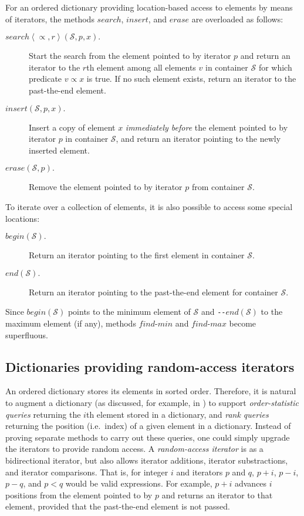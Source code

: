 \documentclass{DIKU-article}
\newcommand{\sequence}[1]{\left\langle#1\right\rangle}
\newcommand{\Findmin}{\mbox{$\mathit{find}$}\textnormal{-}\allowbreak{}\mbox{$\mathit{min}$}}
\newcommand{\Findmax}{\mbox{$\mathit{find}$}\textnormal{-}\allowbreak{}\mbox{$\mathit{max}$}}
\newcommand{\Insert}{\mbox{$\mathit{insert}$}}
\newcommand{\Erase}{\mbox{$\mathit{erase}$}}
\newcommand{\Begin}{\mbox{$\mathit{begin}$}}
\newcommand{\End}{\mbox{$\mathit{end}$}}
\newcommand{\Search}{\mbox{$\mathit{search}$}}
\begin{document}
For an ordered dictionary providing location-based access to elements
by means of iterators, the methods \Search{}, \Insert{}, and
\Erase{} are overloaded as follows:
\begin{description}
\item[$\Search\sequence{\propto, r}(\mathcal{S}, p, x).$] 
Start the search from the element pointed to by iterator $p$ and return
an iterator to the $r$th element among all elements $v$ in container
$\mathcal{S}$ for which predicate $v \propto x$ is true. If no such
element exists,  return an iterator to the past-the-end element.

\item[\Insert{}$(\mathcal{S}, p, x).$] Insert a copy of element $x$
\emph{immediately before} the element pointed to by iterator $p$ in
container $\mathcal{S}$, and return an iterator pointing to the newly inserted element.

\item[\Erase{}$(\mathcal{S}, p).$] Remove the element pointed to by iterator $p$
from container $\mathcal{S}$.
\end{description}

To iterate over a collection of elements, it is also possible to
access some special locations:
\begin{description}
\item[\Begin{}$(\mathcal{S}).$] Return an iterator pointing to the first element
in container $\mathcal{S}$.

\item[\End{}$(\mathcal{S}).$] Return an iterator pointing to the past-the-end
element for container $\mathcal{S}$.
\end{description}
Since \Begin$(\mathcal{S})$ points to the minimum element of $\mathcal{S}$ and
\texttt{-}\texttt{-}\End$(\mathcal{S})$ to the maximum element (if any),
methods \Findmin{} and \Findmax{} become superfluous.

\subsection{Dictionaries providing random-access iterators}

An ordered dictionary stores its elements in sorted order. Therefore,
it is natural to augment a dictionary (as discussed, for example, in
\cite[Section 14.1]{CLRS01}) to support \emph{order-statistic queries}
returning the $i$th element stored in a dictionary, and \emph{rank
queries} returning the position (i.e.~index) of a given element in a
dictionary.  Instead of proving separate methods to carry out these
queries, one could simply upgrade the iterators to provide random
access.  A \emph{random-access iterator} \cite[Clause 24]{ISO} is as a
bidirectional iterator, but also allows iterator additions, iterator
substractions, and iterator comparisons. That is, for integer $i$ and
iterators $p$ and $q$, $p+i$, $p-i$, $p-q$, and $p < q$ would be valid
expressions.  For example, $p+i$ advances $i$ positions from the
element pointed to by $p$ and returns an iterator to that element,
provided that the past-the-end element is not passed.
\end{document}

